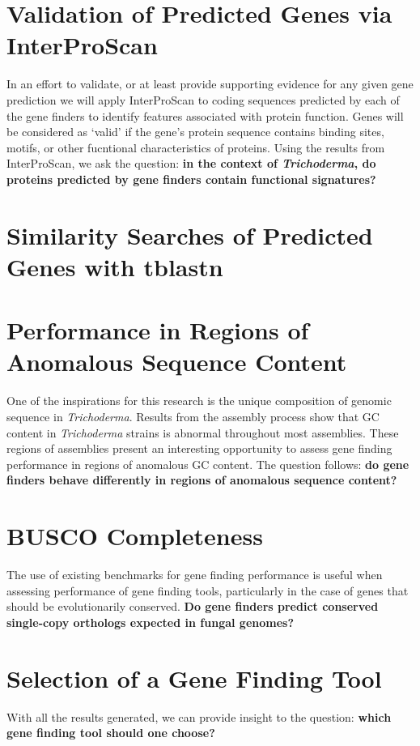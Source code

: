 \section{Validation of Predicted Genes via InterProScan}
\label{rq:interproscan}
In an effort to validate, or at least provide supporting evidence for
any given gene prediction we will apply InterProScan to coding
sequences predicted by each of the gene finders to identify features
associated with protein function. Genes will be considered as `valid'
if the gene's protein sequence contains binding sites, motifs, or
other fucntional characteristics of proteins. Using the results from
InterProScan, we ask the question: \textbf{in the context of
  \textit{Trichoderma}, do proteins predicted by gene finders contain
  functional signatures?}

\section{Similarity Searches of Predicted Genes with tblastn}
\label{rq:tblastn}


\section{Performance in Regions of Anomalous Sequence Content}
\label{rq:anomalous-sequence-content}

One of the inspirations for this research is the unique composition of
genomic sequence in \textit{Trichoderma}. Results from the assembly
process show that GC content in \textit{Trichoderma} strains is
abnormal throughout most assemblies. These regions of assemblies
present an interesting opportunity to assess gene finding performance
in regions of anomalous GC content. The question follows: \textbf{do
  gene finders behave differently in regions of anomalous sequence
  content?}

\section{BUSCO Completeness}
\label{rq:busco-completeness}
The use of existing benchmarks for gene finding performance is useful
when assessing performance of gene finding tools, particularly in the
case of genes that should be evolutionarily conserved. \textbf{Do gene
  finders predict conserved single-copy orthologs expected in fungal
  genomes?}

\section{Selection of a Gene Finding Tool}

With all the results generated, we can provide insight to the
question: \textbf{which gene finding tool should one choose?}
